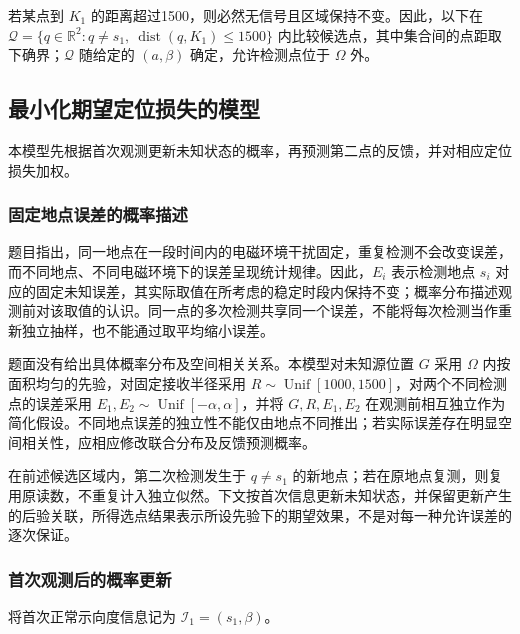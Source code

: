 \documentclass[UTF8,a4paper,zihao=-4,fontset=none]{ctexart}
\begin{document}
若某点到 \(K_1\) 的距离超过1500，则必然无信号且区域保持不变。因此，以下在 \(\mathcal Q=\{q\in\mathbb R^2:q\ne s_1,\ \operatorname{dist}(q,K_1)\le1500\}\) 内比较候选点，其中集合间的点距取下确界；\(\mathcal Q\) 随给定的 \((a,\beta)\) 确定，允许检测点位于 \(\Omega\) 外。

\subsection{最小化期望定位损失的模型}

本模型先根据首次观测更新未知状态的概率，再预测第二点的反馈，并对相应定位损失加权。

\subsubsection{固定地点误差的概率描述}

题目指出，同一地点在一段时间内的电磁环境干扰固定，重复检测不会改变误差，而不同地点、不同电磁环境下的误差呈现统计规律。因此，\(E_i\) 表示检测地点 \(s_i\) 对应的固定未知误差，其实际取值在所考虑的稳定时段内保持不变；概率分布描述观测前对该取值的认识。同一点的多次检测共享同一个误差，不能将每次检测当作重新独立抽样，也不能通过取平均缩小误差。

题面没有给出具体概率分布及空间相关关系。本模型对未知源位置 \(G\) 采用 \(\Omega\) 内按面积均匀的先验，对固定接收半径采用 \(R\sim\operatorname{Unif}[1000,1500]\)，对两个不同检测点的误差采用 \(E_1,E_2\sim\operatorname{Unif}[-\alpha,\alpha]\)，并将 \(G,R,E_1,E_2\) 在观测前相互独立作为简化假设。不同地点误差的独立性不能仅由地点不同推出；若实际误差存在明显空间相关性，应相应修改联合分布及反馈预测概率。

在前述候选区域内，第二次检测发生于 \(q\ne s_1\) 的新地点；若在原地点复测，则复用原读数，不重复计入独立似然。下文按首次信息更新未知状态，并保留更新产生的后验关联，所得选点结果表示所设先验下的期望效果，不是对每一种允许误差的逐次保证。

\subsubsection{首次观测后的概率更新}

将首次正常示向度信息记为 \(\mathcal I_1=(s_1,\beta)\)。
\end{document}
